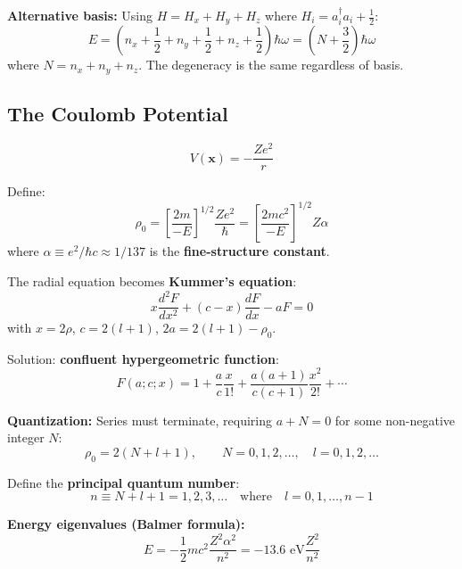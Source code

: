 \documentclass[11pt,a4paper]{article}
\begin{document}
\textbf{Alternative basis:} Using $H = H_x + H_y + H_z$ where $H_i = a_i^\dagger a_i + \frac{1}{2}$:
\begin{equation}
E = \left(n_x + \frac{1}{2} + n_y + \frac{1}{2} + n_z + \frac{1}{2}\right)\hbar\omega = \left(N + \frac{3}{2}\right)\hbar\omega
\tag{3.304}
\end{equation}
where $N = n_x + n_y + n_z$. The degeneracy is the same regardless of basis.

\subsection{The Coulomb Potential}

\begin{equation}
V(\mathbf{x}) = -\frac{Ze^2}{r}
\tag{3.305}
\end{equation}

Define:
\begin{equation}
\rho_0 = \left[\frac{2m}{-E}\right]^{1/2}\frac{Ze^2}{\hbar} = \left[\frac{2mc^2}{-E}\right]^{1/2}Z\alpha
\tag{3.306}
\end{equation}
where $\alpha \equiv e^2/\hbar c \approx 1/137$ is the \textbf{fine-structure constant}.

The radial equation becomes \textbf{Kummer's equation}:
\begin{equation}
x\frac{d^2 F}{dx^2} + (c - x)\frac{dF}{dx} - aF = 0
\tag{3.308}
\end{equation}
with $x = 2\rho$, $c = 2(l+1)$, $2a = 2(l+1) - \rho_0$.

Solution: \textbf{confluent hypergeometric function}:
\begin{equation}
F(a; c; x) = 1 + \frac{a}{c}\frac{x}{1!} + \frac{a(a+1)}{c(c+1)}\frac{x^2}{2!} + \cdots
\tag{3.310}
\end{equation}

\textbf{Quantization:} Series must terminate, requiring $a + N = 0$ for some non-negative integer $N$:
\begin{equation}
\rho_0 = 2(N + l + 1), \qquad N = 0, 1, 2, \ldots, \quad l = 0, 1, 2, \ldots
\tag{3.312}
\end{equation}

Define the \textbf{principal quantum number}:
\begin{equation}
\boxed{n \equiv N + l + 1 = 1, 2, 3, \ldots \quad \text{where} \quad l = 0, 1, \ldots, n-1}
\tag{3.313}
\end{equation}

\textbf{Energy eigenvalues (Balmer formula):}
\begin{equation}
\boxed{E = -\frac{1}{2}mc^2\frac{Z^2\alpha^2}{n^2} = -13.6\text{ eV}\frac{Z^2}{n^2}}
\tag{3.315}
\end{equation}
\end{document}
